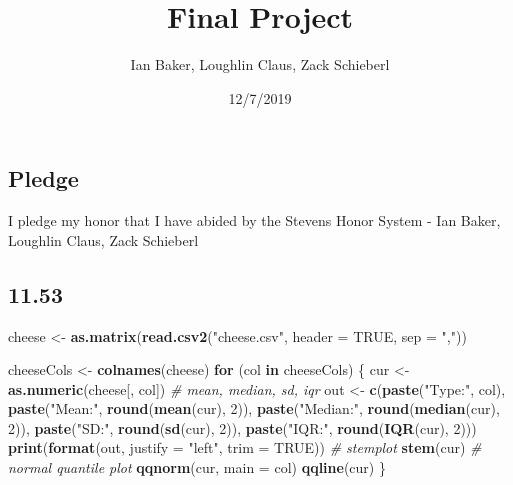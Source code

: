 \documentclass[]{article}
\title{Final Project}
\author{Ian Baker, Loughlin Claus, Zack Schieberl}
\date{12/7/2019}
\newenvironment{Shaded}{\begin{snugshade}}{\end{snugshade}}
\newcommand{\CommentTok}[1]{\textcolor[rgb]{0.56,0.35,0.01}{\textit{#1}}}
\newcommand{\ControlFlowTok}[1]{\textcolor[rgb]{0.13,0.29,0.53}{\textbf{#1}}}
\newcommand{\DataTypeTok}[1]{\textcolor[rgb]{0.13,0.29,0.53}{#1}}
\newcommand{\DecValTok}[1]{\textcolor[rgb]{0.00,0.00,0.81}{#1}}
\newcommand{\KeywordTok}[1]{\textcolor[rgb]{0.13,0.29,0.53}{\textbf{#1}}}
\newcommand{\NormalTok}[1]{#1}
\newcommand{\OtherTok}[1]{\textcolor[rgb]{0.56,0.35,0.01}{#1}}
\newcommand{\StringTok}[1]{\textcolor[rgb]{0.31,0.60,0.02}{#1}}
\begin{document}
\maketitle

\hypertarget{pledge}{%
\subsection{Pledge}\label{pledge}}

I pledge my honor that I have abided by the Stevens Honor System - Ian
Baker, Loughlin Claus, Zack Schieberl

\hypertarget{section}{%
\subsection{11.53}\label{section}}

\begin{Shaded}
\begin{Highlighting}[]
\NormalTok{cheese <-}\StringTok{ }\KeywordTok{as.matrix}\NormalTok{(}\KeywordTok{read.csv2}\NormalTok{(}\StringTok{"cheese.csv"}\NormalTok{, }\DataTypeTok{header =} \OtherTok{TRUE}\NormalTok{, }\DataTypeTok{sep =} \StringTok{","}\NormalTok{))}

\NormalTok{cheeseCols <-}\StringTok{ }\KeywordTok{colnames}\NormalTok{(cheese)}
\ControlFlowTok{for}\NormalTok{ (col }\ControlFlowTok{in}\NormalTok{ cheeseCols) \{}
\NormalTok{  cur <-}\StringTok{ }\KeywordTok{as.numeric}\NormalTok{(cheese[, col])}
  \CommentTok{# mean, median, sd, iqr}
\NormalTok{  out <-}\StringTok{ }\KeywordTok{c}\NormalTok{(}\KeywordTok{paste}\NormalTok{(}\StringTok{"Type:"}\NormalTok{, col), }\KeywordTok{paste}\NormalTok{(}\StringTok{"Mean:"}\NormalTok{, }\KeywordTok{round}\NormalTok{(}\KeywordTok{mean}\NormalTok{(cur), }\DecValTok{2}\NormalTok{)),}
           \KeywordTok{paste}\NormalTok{(}\StringTok{"Median:"}\NormalTok{, }\KeywordTok{round}\NormalTok{(}\KeywordTok{median}\NormalTok{(cur), }\DecValTok{2}\NormalTok{)), }\KeywordTok{paste}\NormalTok{(}\StringTok{"SD:"}\NormalTok{, }\KeywordTok{round}\NormalTok{(}\KeywordTok{sd}\NormalTok{(cur), }\DecValTok{2}\NormalTok{)),}
           \KeywordTok{paste}\NormalTok{(}\StringTok{"IQR:"}\NormalTok{, }\KeywordTok{round}\NormalTok{(}\KeywordTok{IQR}\NormalTok{(cur), }\DecValTok{2}\NormalTok{)))}
  \KeywordTok{print}\NormalTok{(}\KeywordTok{format}\NormalTok{(out, }\DataTypeTok{justify =} \StringTok{"left"}\NormalTok{, }\DataTypeTok{trim =} \OtherTok{TRUE}\NormalTok{))}
  \CommentTok{# stemplot}
  \KeywordTok{stem}\NormalTok{(cur)}
  \CommentTok{# normal quantile plot}
  \KeywordTok{qqnorm}\NormalTok{(cur, }\DataTypeTok{main =}\NormalTok{ col)}
  \KeywordTok{qqline}\NormalTok{(cur)}
\NormalTok{\}}
\end{Highlighting}
\end{Shaded}
\end{document}
